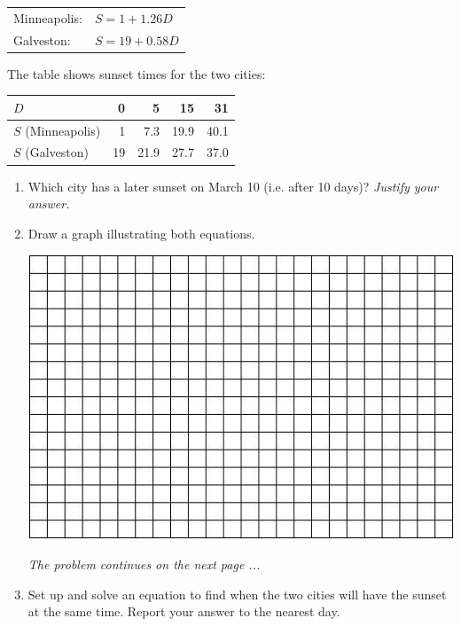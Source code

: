 \documentclass[12pt]{article}
\begin{document}
\begin{enumerate}
\vspace{.1in}

\begin{center}
\begin{tabular} {ll} 
Minneapolis: &$S=1+1.26D$ \\
Galveston: & $S=19+0.58D$ \\
\end{tabular}
\end{center}

The table shows sunset times for the two cities:

\begin{center}
\begin{tabular} {|l|r|r|r|r|} \hline
$D$ & 0 & 5 & 15 & 31 \\ \hline
$S$ (Minneapolis) & 1 &  7.3 & 19.9 & 40.1  \\ \hline
$S$ (Galveston) & 19 & 21.9 & 27.7 & 37.0 \\ \hline
\end{tabular}
\end{center}

\begin{enumerate}

\item Which city has a later sunset on March 10 (i.e. after 10 days)?  \emph{Justify your answer.}
\vfill

\item Draw a graph illustrating both equations.
\vspace{.1in}
\begin{center}
 {\includegraphics [width = 6in] {../GraphPaper}}
\end{center}
\vfill
\emph{The problem continues on the next page ...}
\pagebreak
\item Set up and solve an equation to find when the two cities will have the sunset at the same time. Report your answer to the nearest day.


\end{enumerate}
\end{enumerate}
\end{document}
